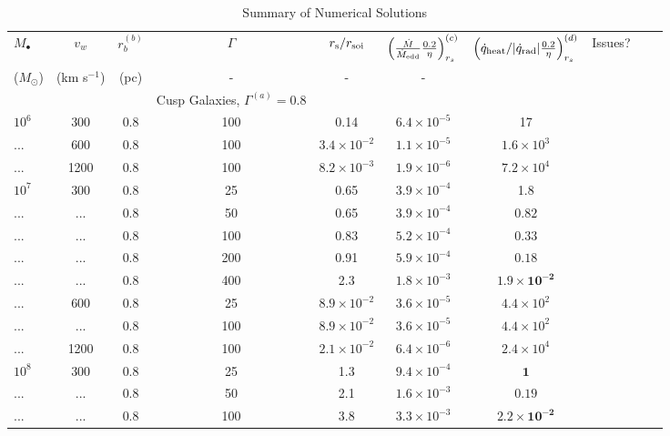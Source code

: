 \documentclass[usenatbib,fleqn]{mn2e}
\begin{document}
\begin{table}
\begin{threeparttable}
\begin{minipage}{18cm}
\caption{Summary of Numerical Solutions}
\begin{tabular}{lccccccccc}
  \hline
  {$M_{\bullet}$} & {$v_{w}$} & {$r_b^{(b)}$} &  $\Gamma$ &  $r_{\rm
    s}/r_{\rm soi}$ &  {$\left(\frac{\dot{M}}{\dot{M}_{\rm
          edd}}\frac{0.2}{\eta}\right)_{r_{s}}^{(c)}$} &
  {$\left(\dot{q}_{\rm heat}/|\dot{q}_{\rm rad}|\frac{0.2}{\eta}\right)_{r_s}^{(d)}$} & Issues? \\
  ($M_{\odot}$) & (km s$^{-1}$) & (pc) &- & - & - &  & \\ 
\hline
 & & & Cusp Galaxies, $\Gamma^{(a)} = 0.8$ & & & & & \\
$    10^{ 6 }$ & 300 & 0.8 & 100 & 0.14 & $ 6.4 \times 10^{ -5 }$ & 17 \\
... & 600 & 0.8 & 100 & $ 3.4 \times 10^{ -2 }$ & $ 1.1 \times 10^{ -5 }$ & $ 1.6 \times 10^{ 3 }$ \\
... & 1200 & 0.8 & 100 & $ 8.2 \times 10^{ -3 }$ & $ 1.9 \times 10^{ -6 }$ & $ 7.2 \times 10^{ 4 }$ \\
$    10^{ 7 }$ & 300 & 0.8 & 25 & 0.65 & $ 3.9 \times 10^{ -4 }$ & 1.8 \\
... & ... & 0.8 & 50 & 0.65 & $ 3.9 \times 10^{ -4 }$ & $\mathbf{0.82}$ \\
... & ... & 0.8 & 100 & 0.83 & $ 5.2 \times 10^{ -4 }$ & $\mathbf{0.33}$ \\
... & ... & 0.8 & 200 & 0.91 & $ 5.9 \times 10^{ -4 }$ & $\mathbf{0.18}$ \\
... & ... & 0.8 & 400 & 2.3 & $ 1.8 \times 10^{ -3 }$ & $\mathbf{ 1.9 \times 10^{ -2 }}$ \\
... & 600 & 0.8 & 25 & $ 8.9 \times 10^{ -2 }$ & $ 3.6 \times 10^{ -5 }$ & $ 4.4 \times 10^{ 2 }$ \\
... & ... & 0.8 & 100 & $ 8.9 \times 10^{ -2 }$ & $ 3.6 \times 10^{ -5 }$ & $ 4.4 \times 10^{ 2 }$ \\
... & 1200 & 0.8 & 100 & $ 2.1 \times 10^{ -2 }$ & $ 6.4 \times 10^{ -6 }$ & $ 2.4 \times 10^{ 4 }$ \\
$    10^{ 8 }$ & 300 & 0.8 & 25 & 1.3 & $ 9.4 \times 10^{ -4 }$ & $\mathbf{1}$ \\
... & ... & 0.8 & 50 & 2.1 & $ 1.6 \times 10^{ -3 }$ & $\mathbf{0.19}$ \\
... & ... & 0.8 & 100 & 3.8 & $ 3.3 \times 10^{ -3 }$ & $\mathbf{ 2.2 \times 10^{ -2 }}$ \\

\end{tabular}
\end{minipage}
\end{threeparttable}
\end{table}
\end{document}
